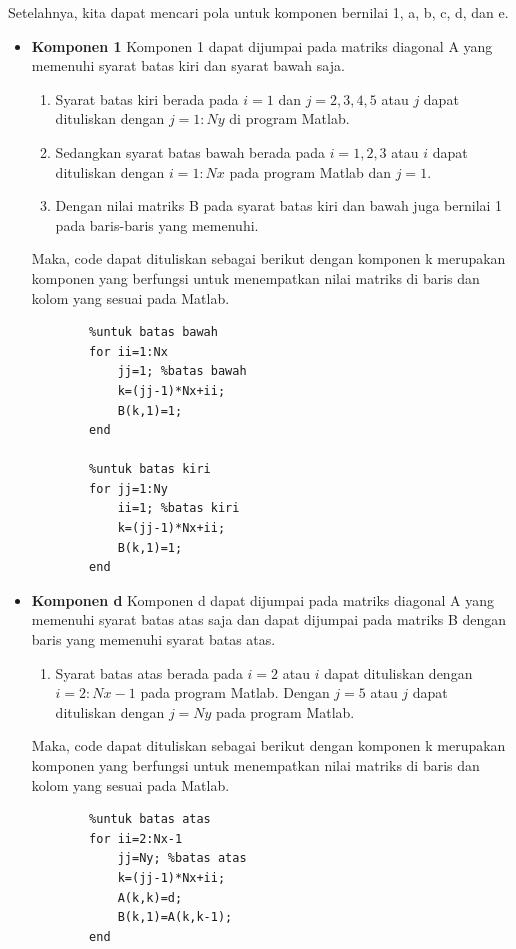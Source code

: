 \documentclass{article}
\begin{document}
Setelahnya, kita dapat mencari pola untuk komponen bernilai 1, a, b, c, d, dan e.
\begin{itemize}
    \item \textbf{Komponen 1}
    \subitem Komponen 1 dapat dijumpai pada matriks diagonal A yang memenuhi syarat batas kiri dan syarat bawah saja. 
    \begin{enumerate}
        \item Syarat batas kiri berada pada \(i=1\) dan \(j=2,3,4,5\) atau \(j\) dapat dituliskan dengan \(j=1:Ny\) di program Matlab.
        \item Sedangkan syarat batas bawah berada pada \(i=1,2,3\) atau \(i\) dapat dituliskan dengan \(i=1:Nx\) pada program Matlab dan \(j=1\). 
        \item Dengan nilai matriks B pada syarat batas kiri dan bawah juga bernilai 1 pada baris-baris yang memenuhi. 
    \end{enumerate}
    
    Maka, code dapat dituliskan sebagai berikut dengan komponen k merupakan komponen yang berfungsi untuk menempatkan nilai matriks di baris dan kolom yang sesuai pada Matlab.
    \begin{lstlisting}
        %untuk batas bawah
        for ii=1:Nx
            jj=1; %batas bawah
            k=(jj-1)*Nx+ii;
            B(k,1)=1;
        end
        
        %untuk batas kiri
        for jj=1:Ny
            ii=1; %batas kiri
            k=(jj-1)*Nx+ii;
            B(k,1)=1; 
        end
    \end{lstlisting}

    \item \textbf{Komponen d}
    \subitem Komponen d dapat dijumpai pada matriks diagonal A yang memenuhi syarat batas atas saja dan dapat dijumpai pada matriks B dengan baris yang memenuhi syarat batas atas.
    \begin{enumerate}
        \item Syarat batas atas berada pada \(i=2\) atau \(i\) dapat dituliskan dengan \(i=2:Nx-1\) pada program Matlab. Dengan \(j=5\) atau \(j\) dapat dituliskan dengan \(j=Ny\) pada program Matlab. 
    \end{enumerate}
    Maka, code dapat dituliskan sebagai berikut dengan komponen k merupakan komponen yang berfungsi untuk menempatkan nilai matriks di baris dan kolom yang sesuai pada Matlab.
     \begin{lstlisting}
        %untuk batas atas
        for ii=2:Nx-1
            jj=Ny; %batas atas
            k=(jj-1)*Nx+ii;
            A(k,k)=d;
            B(k,1)=A(k,k-1);
        end
    \end{lstlisting}


\end{itemize}
\end{document}

